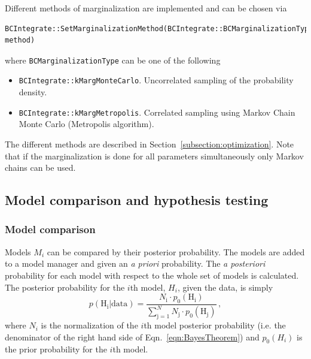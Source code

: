 \documentclass[11pt, a4paper]{article}
\begin{document}
\noindent 
Different methods of marginalization are implemented and can be chosen
via
%
\begin{verbatim}
BCIntegrate::SetMarginalizationMethod(BCIntegrate::BCMarginalizationType method)
\end{verbatim} 

\noindent
where \verb|BCMarginalizationType| can be one of the following 
% 
\begin{itemize}
\item \verb|BCIntegrate::kMargMonteCarlo|. Uncorrelated sampling of the
 probability density.  
\item \verb|BCIntegrate::kMargMetropolis|. Correlated sampling using
  Markov Chain Monte Carlo (Metropolis algorithm). 
\end{itemize} 

\noindent 
The different methods are described in
Section~\ref{subsection:optimization}. Note that if the
marginalization is done for all parameters simultaneously only Markov
chains can be used. \\


\subsection{Model comparison and hypothesis testing} 


\subsubsection{Model comparison}

Models $M_{i}$ can be compared by their posterior probability. The
models are added to a model manager and given an {\it a priori}
probability. The {\it a posteriori} probability for each model with
respect to the whole set of models is calculated. The posterior
probability for the $i$th model, $H_{i}$, given the data, is simply
%
\begin{equation}
p(\mathrm{H_{i}}|\mathrm{data}) = \frac{N_{\mathrm{i}} \cdot p_{0}(\mathrm{H_{i}})}{\sum_{\mathrm{j} = 1}^{N} N_{\mathrm{j}} \cdot p_{0}(\mathrm{H_{j}})} \, , 
\end{equation}
%
where $N_{i}$ is the normalization of the $i$th model posterior
probability (i.e. the denominator of the right hand side of
Eqn.~\ref{eqn:BayesTheorem}) and $p_{0}(H_{i})$ is the prior
probability for the $i$th model. \\ 
\end{document}
